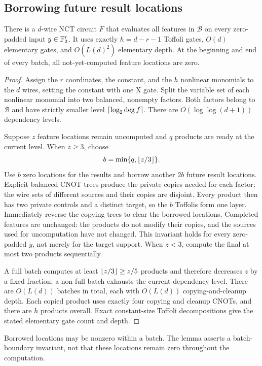 \subsection{Borrowing future result locations}
\begin{lemma}\label{lem:recycling}
There is a $d$-wire NCT circuit $F$ that evaluates all features in $\mathcal B$ on every zero-padded input $y\in\mathbb F_2^r$. It uses exactly $h=d-r-1$ Toffoli gates, $O(d)$ elementary gates, and $O(L(d)^2)$ elementary depth. At the beginning and end of every batch, all not-yet-computed feature locations are zero.
\end{lemma}
\begin{proof}
Assign the $r$ coordinates, the constant, and the $h$ nonlinear monomials to the $d$ wires, setting the constant with one X gate. Split the variable set of each nonlinear monomial into two balanced, nonempty factors. Both factors belong to $\mathcal B$ and have strictly smaller level $\left\lceil \log_2\deg f\right\rceil$. There are $O(\log\log(d+1))$ dependency levels.

Suppose $z$ feature locations remain uncomputed and $q$ products are ready at the current level. When $z\ge3$, choose
\[
b=\min\{q,\left\lfloor z/3\right\rfloor\}.
\]
Use $b$ zero locations for the results and borrow another $2b$ future result locations. Explicit balanced CNOT trees produce the private copies needed for each factor; the wire sets of different sources and their copies are disjoint. Every product then has two private controls and a distinct target, so the $b$ Toffolis form one layer. Immediately reverse the copying trees to clear the borrowed locations. Completed features are unchanged: the products do not modify their copies, and the sources used for uncomputation have not changed. This invariant holds for every zero-padded $y$, not merely for the target support. When $z<3$, compute the final at most two products sequentially.

A full batch computes at least $\left\lfloor z/3\right\rfloor\ge z/5$ products and therefore decreases $z$ by a fixed fraction; a non-full batch exhausts the current dependency level. There are $O(L(d))$ batches in total, each with $O(L(d))$ copying-and-cleanup depth. Each copied product uses exactly four copying and cleanup CNOTs, and there are $h$ products overall. Exact constant-size Toffoli decompositions give the stated elementary gate count and depth.
\end{proof}
Borrowed locations may be nonzero within a batch. The lemma asserts a batch-boundary invariant, not that these locations remain zero throughout the computation.

